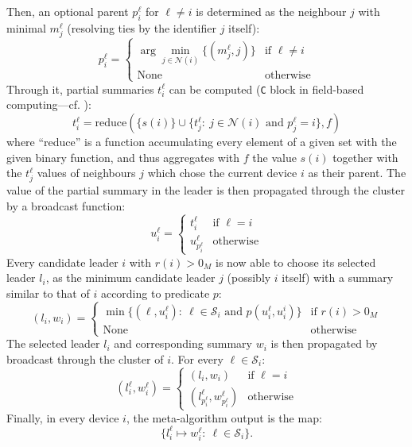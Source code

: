 Then, an optional parent $p^\ell_i$ for $\ell \neq i$ is determined as the neighbour $j$ with minimal $m^\ell_j$ (resolving ties by the identifier $j$ itself):
\[
p^\ell_i = \begin{cases}
	\arg\min_{j \in \mathcal{N}(i)} \{ (m^\ell_j, j) \} & \text{if } \ell \neq i \\
	\text{None} & \text{otherwise}
\end{cases}
\]
Through it, partial summaries $t^\ell_i$ can be computed (\lstinline|C| block in field-based computing---cf. ):
\[
t^\ell_i = \text{reduce}(\{s(i)\} \cup \{t^\ell_j :~ j \in \mathcal{N}(i) \text{ and } p^\ell_j = i\}, f)
\]
where ``reduce'' is a function accumulating every element of a given set with the given binary function,
 and thus aggregates with $f$ the value $s(i)$ together with the $t^\ell_j$ values of neighbours $j$ which chose the current device $i$ as their parent.
%
%
The value of the partial summary in the leader is then propagated through the cluster by a broadcast function:
\[
u^\ell_i = \begin{cases}
	t^\ell_i & \text{if } \ell = i \\
	u^\ell_{p^\ell_i} & \text{otherwise}
\end{cases}
\]
Every candidate leader $i$ with $r(i) > 0_M$ is now able to choose its selected leader $l_i$,
 as the minimum candidate leader $j$ (possibly $i$ itself) with a summary similar to that of $i$ according to predicate $p$:
\[
(l_i, w_i) = \begin{cases}
	\min \{(\ell, u^\ell_i) :~ \ell \in \mathcal{S}_i \text{ and } p(u^\ell_i, u^i_i)\} & \text{if } r(i) > 0_M \\
	\text{None} & \text{otherwise}
\end{cases}
\]
The selected leader $l_i$ and corresponding summary $w_i$ is then propagated by broadcast through the cluster of $i$. For every $\ell \in \mathcal{S}_i$:
\[
(l^\ell_i, w^\ell_i) = \begin{cases}
	(l_i, w_i) & \text{if } \ell = i \\
	(l^\ell_{p^\ell_i}, w^\ell_{p^\ell_i}) & \text{otherwise}
\end{cases}
\]
Finally, in every device $i$, the meta-algorithm output is the map:
\[
\{ l^\ell_i \mapsto w^\ell_i :~ \ell \in \mathcal{S}_i \}.
\]


